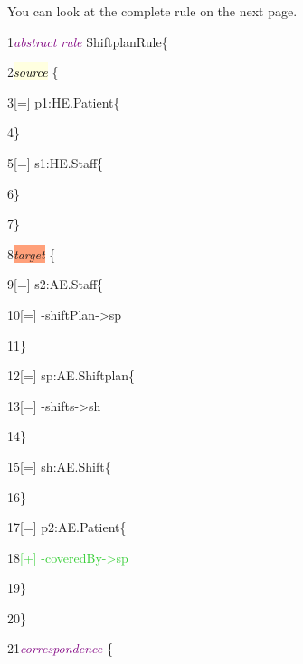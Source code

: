 {You can look at the complete rule on the next page.

\clearpage

{

1\hspace{0.5cm}\textcolor{Purple}{\textit{abstract}} \textcolor{Purple}{\textit{rule}} ShiftplanRule\{ 
	
	2\hspace{0.5cm}\textcolor{black}{\colorbox{LightYellow}{\textit{source}}} \{ 
	
	3\hspace{1cm}[=] p1:HE.Patient\{
		
	4\hspace{1cm}\}
		
	5\hspace{1cm}[=] s1:HE.Staff\{
		
	6\hspace{1cm}\}
		
	7\hspace{0.5cm}\}
		
	8\hspace{0.5cm}\colorbox{LightSalmon}{\textit{target}} \{ 
		
	9\hspace{1cm}[=] s2:AE.Staff\{
			
	10\hspace{1.5cm}[=] -shiftPlan->sp
			
	11\hspace{1cm}\}
			
	12\hspace{1cm}[=] sp:AE.Shiftplan\{
			
	13\hspace{1.5cm}[=] -shifts->sh
			
	14\hspace{1cm}\}
			
	15\hspace{1cm}[=] sh:AE.Shift\{
			
	16\hspace{1cm}\}
			
	17\hspace{1cm}[=] p2:AE.Patient\{
			
	18\hspace{1.5cm}\textcolor{LimeGreen}{[+] -coveredBy->sp}
			
	19\hspace{1cm}\}
			
	20\hspace{0.5cm}\}
			
	21\hspace{0.5cm}\textcolor{Purple}{\textit{correspondence}} \{ 
			
}}
